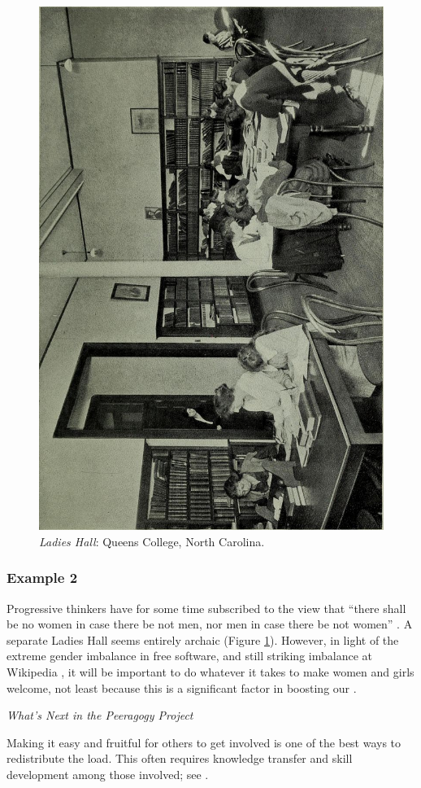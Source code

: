 \begin{figure}
\vspace{-.6cm}
\begin{center}
\includegraphics[width=.22\textwidth,angle=-90,trim=20 0 140 10, clip=true]{ladies-hall}
\end{center}
\vspace{-.5cm}
\captionsetup{font=footnotesize,width=.4\textwidth}
\caption{\textsl{Ladies Hall}: Queens College, North Carolina.
\label{ladies-hall}}
\vspace{-.5cm}
\end{figure}

\subsubsection*{Example 2}
Progressive thinkers have for some time subscribed to the view that
``there shall be no women in case there be not men, nor men in case
there be not women'' \cite[Chapter 1.LII]{rabelais1894gargantua}.  A
separate Ladies Hall seems entirely archaic (Figure
\ref{ladies-hall}).  However, in light of the extreme gender imbalance
in free software, and still striking imbalance at Wikipedia
\cite{gender,FM4291}, it will be important to do whatever it takes to
make women and girls welcome, not least because this is a significant
factor in boosting our .

\endgroup


\begin{framed}
\noindent 
\emph{What's Next in the Peeragogy Project}
\begin{collectinmacro}{\CarryingWN}{}{}
Making it easy and fruitful for others to get involved is one of the best ways to redistribute the load.  This often requires knowledge transfer and skill development among those involved; see .
\end{collectinmacro}
\CarryingWN
\end{framed}


